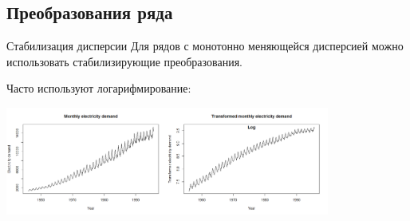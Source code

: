 \documentclass[9pt,pdf,utf8,hyperref={unicode},aspectratio=169]{beamer}
\begin{document}
\subsection{Преобразования ряда}
\begin{frame}{Стабилизация дисперсии}
	Для рядов с монотонно меняющейся дисперсией можно использовать стабилизирующие преобразования.
	
	
	\bigskip
	
	Часто используют логарифмирование:
	
	\bigskip
	
	\begin{center}
		\includegraphics[width=0.8\textwidth]{logtrans.png}
	\end{center}		
\end{frame}
\end{document}
